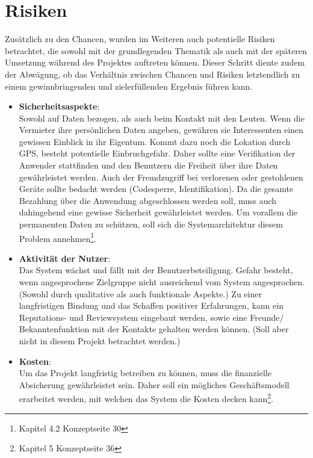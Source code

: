 
\section{Risiken}
Zusätzlich zu den Chancen, wurden im Weiteren auch potentielle Risiken betrachtet, die sowohl mit der grundlegenden Thematik als auch mit der späteren Umsetzung während des Projektes auftreten können.
Dieser Schritt diente zudem der Abwägung, ob das Verhältnis zwischen Chancen und Risiken letztendlich zu einem gewinnbringenden und zielerfüllenden Ergebnis führen kann.\\

\begin{itemize}
   \item \textbf{Sicherheitsaspekte}:\\ Sowohl auf Daten bezogen, als auch beim Kontakt mit den Leuten. Wenn die Vermieter ihre persönlichen Daten angeben, gewähren sie Interessenten einen gewissen Einblick in ihr Eigentum. Kommt dazu noch die Lokation durch GPS, besteht potentielle Einbruchgefahr. Daher sollte eine Verifikation der Anwender stattfinden und den Benutzern die Freiheit über ihre Daten gewährleistet werden. Auch der Fremdzugriff bei verlorenen oder gestohlenen Geräte sollte bedacht werden (Codesperre, Identifikation). Da die gesamte Bezahlung über die Anwendung abgeschlossen werden soll, muss auch dahingehend eine gewisse Sicherheit gewährleistet werden. Um vorallem die permanenten Daten zu schützen, soll sich die Systemarchitektur diesem Problem annehmen\footnote{Kapitel 4.2 Konzeptseite 30}.

   \item \textbf{Aktivität der Nutzer}:\\ Das System wächst und fällt mit der Benutzerbeteiligung. Gefahr besteht, wenn angesprochene Zielgruppe nicht ausreichend vom System angesprochen. (Sowohl durch qualitative als auch funktionale Aspekte.) Zu einer langfristigen Bindung und das Schaffen positiver Erfahrungen, kann ein Reputations- und Reviewsystem eingebaut werden, sowie eine Freunde/ Bekanntenfunktion mit der Kontakte gehalten werden können. (Soll aber nicht in diesem Projekt betrachtet werden.)

   \item \textbf{Kosten}:\\ Um das Projekt langfristig betreiben zu können, muss die finanzielle Absicherung gewährleistet sein. Daher soll ein mögliches Geschäftsmodell erarbeitet werden, mit welchen das System die Kosten decken kann\footnote{Kapitel 5 Konzeptseite 36}.


\end{itemize}
